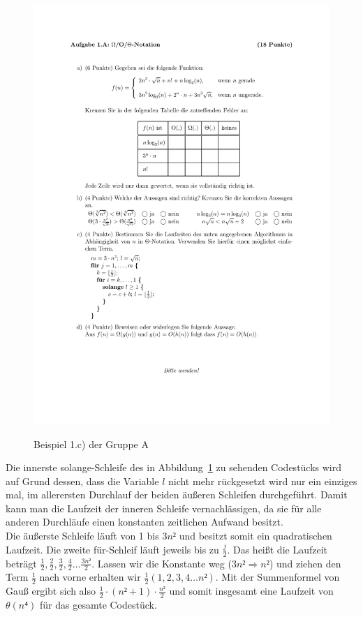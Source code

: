 \documentclass[a4paper, 12pt]{article}
\begin{document}
\begin{figure}[htbp]
	\caption{Beispiel 1.c) der Gruppe A}
	\vskip 0.2cm
	\centering
	\includegraphics{Figures/Test_2007-11-16_1Ac}
	\label{figure:Test_2007-11-16_1Ac}
\end{figure}

Die innerste solange-Schleife des in Abbildung~\ref{figure:Test_2007-11-16_1Ac} zu sehenden Codestücks wird auf Grund dessen, dass die Variable $l$ nicht mehr rückgesetzt wird nur ein einziges mal, im allerersten Durchlauf der beiden äußeren Schleifen durchgeführt. Damit kann man die Laufzeit der inneren Schleife vernachlässigen, da sie für alle anderen Durchläufe einen konstanten zeitlichen Aufwand besitzt.\\

Die äußerste Schleife läuft von 1 bis $3n²$ und besitzt somit ein quadratischen Laufzeit. Die zweite für-Schleif läuft jeweils bis zu $\frac{j}{2}$. Das heißt die Laufzeit beträgt $\frac{1}{2},\frac{2}{2},\frac{3}{2},\frac{4}{2}\dots\frac{3n²}{2}$. Lassen wir die Konstante weg ($3n² \Rightarrow n²$) und ziehen den Term $\frac{1}{2}$ nach vorne erhalten wir $\frac{1}{2}\left(1,2,3,4\dots n²\right)$. Mit der Summenformel von Gauß ergibt sich also $\frac{1}{2}⋅(n²+1)⋅\frac{n²}{2}$ und somit insgesamt eine Laufzeit von $θ\left(n⁴\right)$ für das gesamte Codestück.
\end{document}
